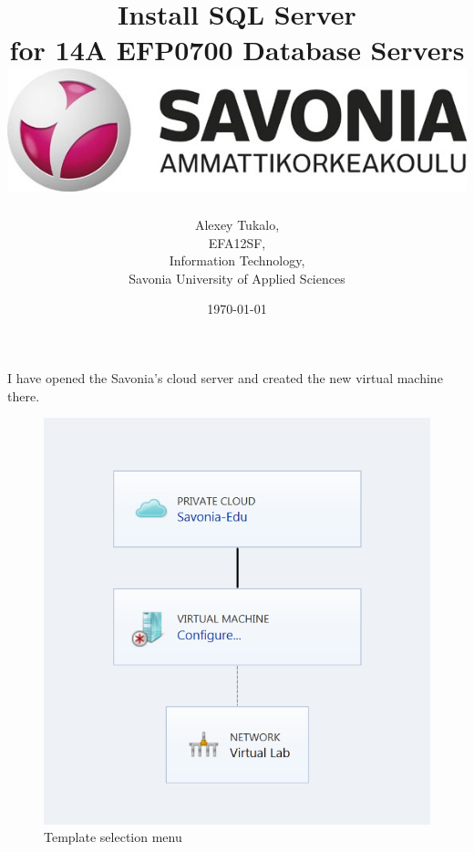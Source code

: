 \documentclass[english]{article}
\date{}
\begin{document}
\title{\vspace{2in}Install SQL Server\\
\small for 14A EFP0700 Database Servers\\
\vspace{0.5in}\includegraphics{savonia.jpg}}

\nopagebreak
\maketitle


\vspace{2.75in}

\author{
\begin{flushright}
Alexey Tukalo,\\
EFA12SF,\\
Information Technology,\\
Savonia University of Applied Sciences
\end{flushright}
}

\date{\today}
\thispagestyle{empty}

\newpage
\setcounter{page}{1}
\setcounter{tocdepth}{2}




I have opened the Savonia’s cloud server and created the new virtual machine there.

\begin{figure}[hb]
\centerline{\includegraphics{SQL/templateSelector}}
\caption{Template selection menu}
\end{figure}
\end{document}
